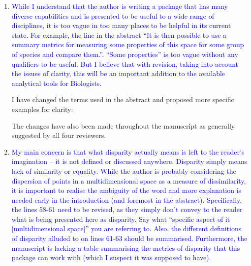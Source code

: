 \documentclass[12pt,letterpaper]{article}
\begin{document}
\begin{enumerate}

\item{\textcolor{blue}{While I understand that the author is writing a package that has many diverse capabilities and is presented to be useful to a wide range of disciplines, it is too vague in too many places to be helpful in its current state.
For example, the line in the abstract “It is then possible to use a summary metrics for measuring some properties of this space for some group of species and compare them.”.
“Some properties” is too vague without any qualifiers to be useful. But I believe that with revision, taking into account the issues of clarity, this will be an important addition to the available analytical tools for Biologists.}}

I have changed the terms used in the abstract and proposed more specific examples for clarity:


The changes have also been made throughout the manuscript as generally suggested by all four reviewers.

\item{\textcolor{blue}{My main concern is that what disparity actually means is left to the reader’s imagination – it is not defined or discussed anywhere.
Disparity simply means lack of similarity or equality. While the author is probably considering the dispersion of points in a multidimensional space as a measure of dissimilarity, it is important to realise the ambiguity of the word and more explanation is needed early in the introduction (and foremost in the abstract).
Specifically, the lines 58-61 need to be revised, as they simply don’t convey to the reader what is being presented here as disparity.
Say what “specific aspect of it [multidimensional space]” you are referring to.
Also, the different definitions of disparity alluded to on lines 61-63 should be summarised.
Furthermore, the manuscript is lacking a table summarising the metrics of disparity that this package can work with (which I suspect it was supposed to have).}}



\end{enumerate}
\end{document}
